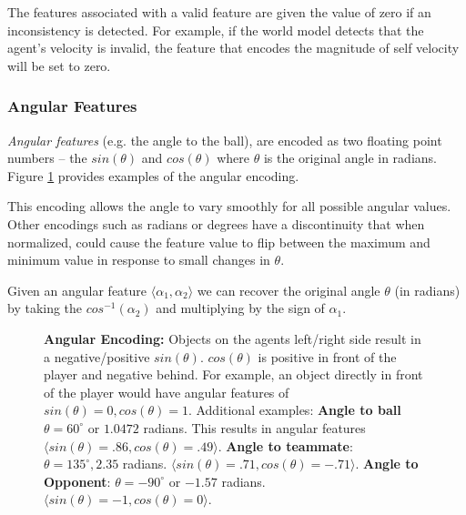 \documentclass[12pt]{article}
\begin{document}
The features associated with a valid feature are given the value of
zero if an inconsistency is detected. For example, if the world model
detects that the agent's velocity is invalid, the feature that encodes
the magnitude of self velocity will be set to zero.

\subsubsection{Angular Features}

\textit{Angular features} (e.g. the angle to the ball), are encoded as
two floating point numbers -- the $sin(\theta)$ and $cos(\theta)$
where $\theta$ is the original angle in radians. Figure
\ref{fig:ang_example} provides examples of the angular encoding.

This encoding allows the angle to vary smoothly for all possible
angular values. Other encodings such as radians or degrees have a
discontinuity that when normalized, could cause the feature value to
flip between the maximum and minimum value in response to small
changes in $\theta$.

Given an angular feature $\langle \alpha_1, \alpha_2 \rangle$ we can
recover the original angle $\theta$ (in radians) by taking the
$cos^{-1}(\alpha_2)$ and multiplying by the sign of $\alpha_1$.

\begin{figure}[htp]
  \centering
  \hspace{3em}
  \caption{\textbf{Angular Encoding:} Objects on the agents left/right
    side result in a negative/positive $sin(\theta)$. $cos(\theta)$ is
    positive in front of the player and negative behind. For example,
    an object directly in front of the player would have angular
    features of $sin(\theta)=0, cos(\theta)=1$. Additional examples:
    \textbf{Angle to ball} $\theta=60^\circ$ or $1.0472$ radians. This
    results in angular features $\langle sin(\theta)=.86,
    cos(\theta)=.49 \rangle$. \textbf{Angle to teammate}:
    $\theta=135^\circ, 2.35$ radians. $\langle sin(\theta)=.71,
    cos(\theta)=-.71 \rangle$. \textbf{Angle to Opponent}:
    $\theta=-90^\circ$ or $-1.57$ radians. $\langle sin(\theta)=-1,
    cos(\theta)=0 \rangle$.}
  \label{fig:ang_example}
\end{figure}
\end{document}
